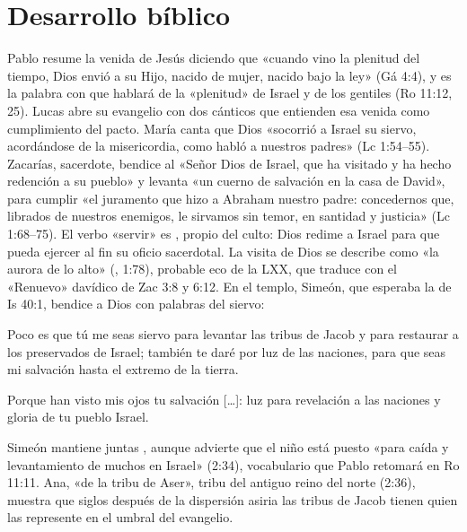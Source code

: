 \section{Desarrollo bíblico}

Pablo resume la venida de Jesús diciendo que «cuando vino la plenitud del tiempo, Dios envió a su Hijo, nacido de mujer, nacido bajo la ley» (Gá 4:4), y  es la palabra con que hablará de la «plenitud» de Israel y de los gentiles (Ro 11:12, 25). Lucas abre su evangelio con dos cánticos que entienden esa venida como cumplimiento del pacto. María canta que Dios «socorrió a Israel su siervo, acordándose de la misericordia, como habló a nuestros padres» (Lc 1:54--55). Zacarías, sacerdote, bendice al «Señor Dios de Israel, que ha visitado y ha hecho redención a su pueblo» y levanta «un cuerno de salvación en la casa de David», para cumplir «el juramento que hizo a Abraham nuestro padre: concedernos que, librados de nuestros enemigos, le sirvamos sin temor, en santidad y justicia» (Lc 1:68--75). El verbo «servir» es , propio del culto: Dios redime a Israel para que pueda ejercer al fin su oficio sacerdotal. La visita de Dios se describe como «la aurora de lo alto» (, 1:78), probable eco de la LXX, que traduce con  el «Renuevo» davídico de Zac 3:8 y 6:12. En el templo, Simeón, que esperaba la  de Is 40:1, bendice a Dios con palabras del siervo:

\begin{cita}Poco es que tú me seas siervo para levantar las tribus de Jacob y para restaurar a los preservados de Israel; también te daré por luz de las naciones, para que seas mi salvación hasta el extremo de la tierra.\end{cita}
\begin{cita}Porque han visto mis ojos tu salvación [\ldots]: luz para revelación a las naciones y gloria de tu pueblo Israel.\end{cita}

Simeón mantiene juntas , aunque advierte que el niño está puesto «para caída y levantamiento de muchos en Israel» (2:34), vocabulario que Pablo retomará en Ro 11:11. Ana, «de la tribu de Aser», tribu del antiguo reino del norte (2:36), muestra que siglos después de la dispersión asiria las tribus de Jacob tienen quien las represente en el umbral del evangelio.


